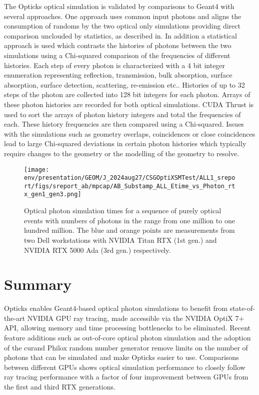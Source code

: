 \documentclass{webofc}
\begin{document}
The Opticks optical simulation is validated by comparisons to Geant4 with several approaches.
One approach uses common input photons and aligns the consumption of randoms by the two optical only simulations 
providing direct comparison unclouded by statistics, as described in\cite{chep2018}.   
In addition a statistical approach is used which contrasts the histories of photons between the 
two simulations using a Chi-squared comparison of the frequencies of different histories. 
Each step of every photon is characterized with a 4 bit integer enumeration representing reflection, 
transmission, bulk absorption, surface absorption, surface detection, scattering, re-emission etc..
Histories of up to 32 steps of the photon are collected into 128 bit integers for each photon.
Arrays of these photon histories are recorded for both optical simulations. CUDA Thrust is
used to sort the arrays of photon history integers and total the frequencies of each.  
These history frequencies are then compared using a Chi-squared. Issues with the 
simulations such as geometry overlaps, coincidences or close coincidences lead to
large Chi-squared deviations in certain photon histories which typically require
changes to the geometry or the modelling of the geometry to resolve.   
%
\begin{figure}
\centering
\texttt{[image: env/presentation/GEOM/J\_2024aug27/CSGOptiXSMTest/ALL1\_sreport/figs/sreport\_ab/mpcap/AB\_Substamp\_ALL\_Etime\_vs\_Photon\_rtx\_gen1\_gen3.png]}
\caption{%
Optical photon simulation times for a sequence of purely optical events with numbers of photons 
in the range from one million to one hundred million. The blue and orange points are measurements from 
two Dell workstations with NVIDIA Titan RTX (1st gen.) and NVIDIA RTX 5000 Ada (3rd gen.) respectively.
}
\label{rtxgenscan}
\vspace{-5mm}
\end{figure}%
%
%     
%
\section{Summary}
%
Opticks enables Geant4-based optical photon simulations to benefit from 
state-of-the-art NVIDIA GPU ray tracing, made accessible via the NVIDIA OptiX 7+ API,
allowing memory and time processing bottlenecks to be eliminated. 
Recent feature additions such as out-of-core optical photon simulation and the 
adoption of the curand Philox random number generator remove limits on the number of 
photons that can be simulated and make Opticks easier to use. 
Comparisons between different GPUs shows optical simulation performance 
to closely follow ray tracing performance with a factor of four improvement between 
GPUs from the first and third RTX generations. 
%
%
\end{document}
